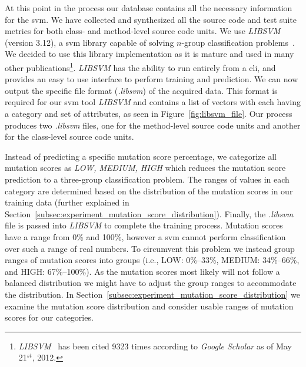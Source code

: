 At this point in the process our database contains all the necessary information for the \gls{svm}. We have collected and synthesized all the source code and test suite metrics for both class- and method-level source code units. We use \emph{LIBSVM} (version 3.12), a \gls{svm} library capable of solving $n$-group classification problems~\cite{CL11}. We decided to use this library implementation as it is mature and used in many other publications\footnote{\emph{LIBSVM}~\cite{CL11} has been cited 9323 times according to \emph{Google Scholar} as of May 21$^{st}$, 2012.}. \emph{LIBSVM} has the ability to run entirely from a \gls{cli}, and provides an easy to use interface to perform training and prediction. We can now output the specific file format (\emph{.libsvm}) of the acquired data. This format is required for our \gls{svm} tool \emph{LIBSVM} and contains a list of vectors with each having a category and set of attributes, as seen in Figure~\ref{fig:libsvm_file}. Our process produces two \emph{.libsvm} files, one for the method-level source code units and another for the class-level source code units.

Instead of predicting a specific mutation score percentage, we categorize all mutation scores as \textit{LOW, MEDIUM, HIGH} which reduces the mutation score prediction to a three-group classification problem. The ranges of values in each category are determined based on the distribution of the mutation scores in our training data (further explained in Section~\ref{subsec:experiment_mutation_score_distribution}). Finally, the \emph{.libsvm} file is passed into \emph{LIBSVM} to complete the training process. Mutation scores have a range from 0\% and 100\%, however a \gls{svm} cannot perform classification over such a range of real numbers. To circumvent this problem we instead group ranges of mutation scores into groups (i.e., LOW: 0\%--33\%, MEDIUM: 34\%--66\%, and HIGH: 67\%--100\%). As the mutation scores most likely will not follow a balanced distribution we might have to adjust the group ranges to accommodate the distribution. In Section~\ref{subsec:experiment_mutation_score_distribution} we examine the mutation score distribution and consider usable ranges of mutation scores for our categories.
\afterpage\clearpage


